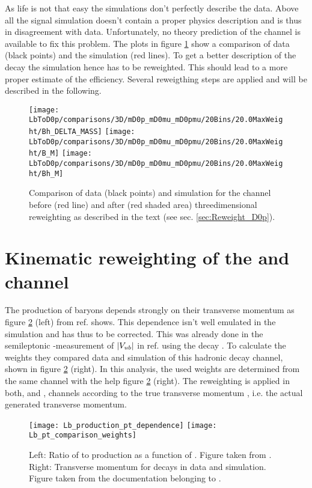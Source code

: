 As life is not that easy the simulations don't perfectly describe the data. 
Above all the \LbToDpmunuX signal simulation doesn't contain a proper physics description and is thus in disagreement with data. 
Unfortunately, no theory prediction of the \LbToDpmunuX channel is available to fix this problem.
The plots in figure \ref{fig:reweighting} show a comparison of data (black points) and the simulation (red lines).
To get a better description of the decay the simulation hence has to be reweighted.
This should lead to a more proper estimate of the efficiency.
Several reweigthing steps are applied and will be described in the following.
\begin{figure}[hptb]
	\centering
	\texttt{[image: LbToD0p/comparisons/3D/mD0p\_mD0mu\_mD0pmu/20Bins/20.0MaxWeight/Bh\_DELTA\_MASS]}
	\texttt{[image: LbToD0p/comparisons/3D/mD0p\_mD0mu\_mD0pmu/20Bins/20.0MaxWeight/B\_M]}
	\texttt{[image: LbToD0p/comparisons/3D/mD0p\_mD0mu\_mD0pmu/20Bins/20.0MaxWeight/Bh\_M]}
	\caption{Comparison of data (black points) and simulation for the \LbToDpmunuX channel before (red line) and after (red shaded area) threedimensional reweighting as described in the text (see sec. \ref{sec:Reweight_D0p}).}
	\label{fig:reweighting}
\end{figure}

\section{Kinematic reweighting of the \LbToDpmunuX and \LbToLcmunu channel}
The production of \Lb baryons depends strongly on their transverse momentum as figure \ref{fig:LbPTrew} (left) from ref. \cite{Lb_production_kinematic} shows. 
This dependence isn't well emulated in the simulation and has thus to be corrected. 
This was already done in the semileptonic \lhcb-measurement of $|{V_{{u}{b}}}|$ in ref. \cite{SL_Vub} using the decay \decay{\Lb}{\jpsi\Dz\proton}. 
To calculate the weights they compared data and simulation of this hadronic \Lb decay channel, shown in figure \ref{fig:LbPTrew} (right). 
In this analysis, the used weights are determined from the same channel with the help figure \ref{fig:LbPTrew} (right).
The reweighting is applied in both, \LbToDpmunuX and \LbToLcmunu, channels according to the true \Lb transverse momentum \pt, i.e. the actual generated transverse momentum.
\begin{figure}[hptb]
	\centering
	\texttt{[image: Lb\_production\_pt\_dependence]}
	\texttt{[image: Lb\_pt\_comparison\_weights]}
	\caption{Left: Ratio of \Lb to \Bd production as a function of \pt. Figure taken from \cite{Lb_production_kinematic}.  Right: Transverse \Lb momentum for \decay{\Lb}{\jpsi\Dz\proton} decays in data and simulation. Figure taken from the documentation belonging to \cite{SL_Vub}.}
	\label{fig:LbPTrew}
\end{figure}


